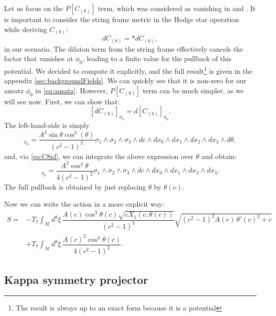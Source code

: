 Let us focus on the $P[C_{(8)}]$ term, which was considered as vanishing in \cite{Albash:2011nw} and \cite{Evans:2005ti}. It is important to consider the string frame metric in the Hodge star operation while deriving $C_{(8)}$:
\begin{equation}
 dC_{(8)} = \ast dC_{(0)},
\end{equation}
in our scenario. The dilaton term from the string frame effectively cancels the factor that vanishes at $\phi_0$, leading to a finite value for the pullback of this potential. We decided to compute it explicitly, and the full result\footnote{The result is always up to an exact form because it is a potential} is given in the appendix \ref{sec:backgroundFields}. We can quickly see that it is non-zero for our ansatz $\phi_0$ in \eqref{eq:ansatz}. However, $P[C_{(8)}]$ term can be much simpler, as we will see now. First, we can show that:
\begin{equation}\label{eq:C8id}
 [d C_{(8)}]_{\phi_0} = d [C_{(8)}]_{\phi_0}.
\end{equation}
The left-hand-side is simply
\begin{equation}
 [d C_{(8)}]_{\phi_0}  = \dfrac{A^2 \sin\theta \cos^3(\theta)}{\left(c^2-1\right)^2} 
\sigma_1 \wedge \sigma_2 \wedge \sigma_3 \wedge dc  \wedge dx_0 \wedge dx_1 \wedge dx_2 \wedge dx_3 \wedge d\theta,
\end{equation}
and, via \eqref{eq:C8id}, we can integrate the above expression over $\theta$ and obtain:
\begin{equation}
[C_{(8)}]_{\phi_0} = \dfrac{A^2 \cos^4\theta}{4 \left(c^2-1\right)^2} \sigma_1 \wedge \sigma_2 \wedge \sigma_3 \wedge dc \wedge dx_0 \wedge dx_1 \wedge dx_2 \wedge dx_3.
\end{equation}
The full pullback is obtained by just replacing $\theta$ by $\theta(c)$.


Now we can write the action in a more explicit way:
\begin{align}\label{eq:ActionWithTheta'}
 S = & -T_7 \int_\mathcal{M} d^8\xi \, \dfrac{A(c) \cos^3\theta (c) \sqrt{c X_1(c, \theta(c))}}{\left(c^2-1\right)^3} \sqrt{\left(c^2-1\right)^2 A(c) \, \theta '(c)^2+c} \nonumber \\
     & +T_7\int _\mathcal{M} d^8\xi \, \dfrac{A(c)^2 \cos^4\theta(c)}{4 \left(c^2-1\right)^2}.
\end{align}



\subsection{Kappa symmetry projector}

